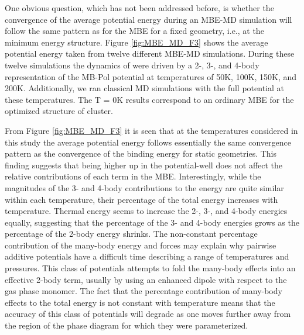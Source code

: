 \documentclass[11pt, proquest]{uwthesis}[2020/02/24]
\let\ce\ch
\begin{document}
\par One obvious question, which has not been addressed before, is whether the convergence of the average potential energy during an MBE-MD simulation will follow the same pattern as for the MBE for a fixed geometry, i.e., at the minimum energy structure. Figure \ref{fig:MBE_MD_F3} shows the average potential energy taken from twelve different MBE-MD simulations. During these twelve simulations the dynamics of \ce{(H2O)_{10}} were driven by a 2-, 3-, and 4-body representation of the MB-Pol potential at temperatures of 50K, 100K, 150K, and 200K. Additionally, we ran classical MD simulations with the full potential at these temperatures. The T = 0K results correspond to an ordinary MBE for the optimized structure of \ce{(H2O)_{10}} cluster.

\par From Figure \ref{fig:MBE_MD_F3} it is seen that at the temperatures considered in this study the average potential energy follows essentially the same convergence pattern as the convergence of the binding energy for static geometries. This finding suggests that being higher up in the potential-well does not affect the relative contributions of each term in the MBE. Interestingly, while the magnitudes of the 3- and 4-body contributions to the energy are quite similar within each temperature, their percentage of the total energy increases with temperature. Thermal energy seems to increase the 2-, 3-, and 4-body energies equally, suggesting that the percentage of the 3- and 4-body energies grows as the percentage of the 2-body energy shrinks. The non-constant percentage contribution of the many-body energy and forces may explain why pairwise additive potentials have a difficult time describing a range of temperatures and pressures. This class of potentials attempts to fold the many-body effects into an effective 2-body term, usually by using an enhanced dipole with respect to the gas phase monomer. The fact that the percentage contribution of many-body effects to the total energy is not constant with temperature means that the accuracy of this class of potentials will degrade as one moves further away from the region of the phase diagram for which they were parameterized.
\end{document}
